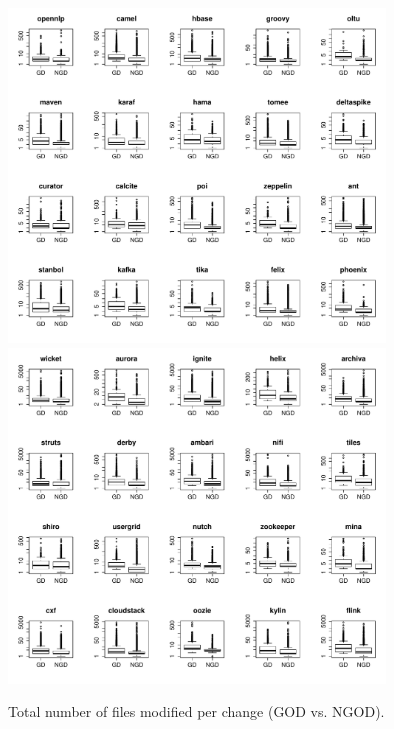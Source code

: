 \begin{figure}[tb]
	\centering
	\includegraphics[width=100mm]{figures/chapter4/rq3_god_nf_logged_1}
	\includegraphics[width=100mm]{figures/chapter4/rq3_god_nf_logged_2}
	\caption{Total number of files modified per change (GOD vs. NGOD).}
	\label{figure:total_files_god_vs_ngod}
\end{figure}


